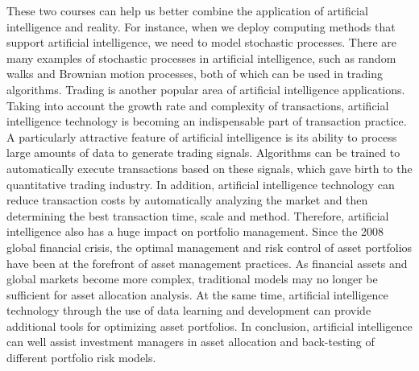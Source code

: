 \documentclass{article}
\begin{document}
    These two courses can help us better combine the application of artificial intelligence and reality. For instance, when we deploy computing methods that support artificial intelligence, we need to model stochastic processes. There are many examples of stochastic processes in artificial intelligence, such as random walks and Brownian motion processes, both of which can be used in trading algorithms. Trading is another popular area of ​​artificial intelligence applications. Taking into account the growth rate and complexity of transactions, artificial intelligence technology is becoming an indispensable part of transaction practice. A particularly attractive feature of artificial intelligence is its ability to process large amounts of data to generate trading signals. Algorithms can be trained to automatically execute transactions based on these signals, which gave birth to the quantitative trading industry. In addition, artificial intelligence technology can reduce transaction costs by automatically analyzing the market and then determining the best transaction time, scale and method. Therefore, artificial intelligence also has a huge impact on portfolio management. Since the 2008 global financial crisis, the optimal management and risk control of asset portfolios have been at the forefront of asset management practices. As financial assets and global markets become more complex, traditional models may no longer be sufficient for asset allocation analysis. At the same time, artificial intelligence technology through the use of data learning and development can provide additional tools for optimizing asset portfolios. In conclusion, artificial intelligence can well assist investment managers in asset allocation and back-testing of different portfolio risk models.\\
    \\
\end{document}
